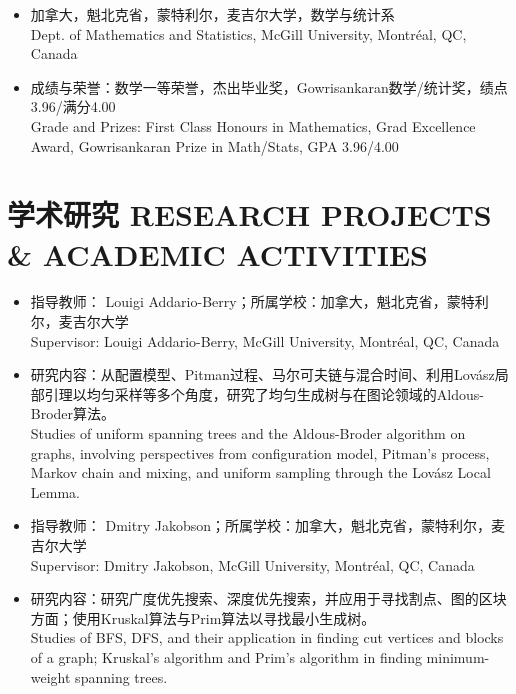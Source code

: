 \documentclass[12pt]{CV_CN} %
\begin{document}
\begin{itemize}
	\item 加拿大，魁北克省，蒙特利尔，麦吉尔大学，数学与统计系\\
	         Dept. of Mathematics and Statistics, McGill University, Montréal, QC, Canada
	\item 成绩与荣誉：数学一等荣誉，杰出毕业奖，Gowrisankaran数学/统计奖，绩点3.96/满分4.00\\
                  Grade and Prizes: First Class Honours in Mathematics, Grad Excellence Award, Gowrisankaran Prize in Math/Stats, GPA 3.96/4.00
\end{itemize}


\section{学术研究 RESEARCH PROJECTS \& ACADEMIC ACTIVITIES}

\begin{itemize}
    \item 指导教师： Louigi Addario-Berry；所属学校：加拿大，魁北克省，蒙特利尔，麦吉尔大学\\
    Supervisor: Louigi Addario-Berry, McGill University, Montréal, QC, Canada
    \item  研究内容：从配置模型、Pitman过程、马尔可夫链与混合时间、利用Lovász局部引理以均匀采样等多个角度，研究了均匀生成树与在图论领域的Aldous-Broder算法。\\
    Studies of uniform spanning trees and the Aldous-Broder algorithm on graphs, involving perspectives from configuration model, Pitman’s process, Markov chain and mixing, and uniform sampling through the Lovász Local Lemma.
\end{itemize}


\begin{itemize}
    \item 指导教师： Dmitry Jakobson；所属学校：加拿大，魁北克省，蒙特利尔，麦吉尔大学\\
    Supervisor: Dmitry Jakobson, McGill University, Montréal, QC, Canada
    \item 研究内容：研究广度优先搜索、深度优先搜索，并应用于寻找割点、图的区块方面；使用Kruskal算法与Prim算法以寻找最小生成树。\\
    Studies of  BFS, DFS, and their application in finding cut vertices and blocks of a graph; Kruskal’s algorithm and Prim’s algorithm in finding minimum-weight spanning trees. 
\end{itemize}
\end{document}
